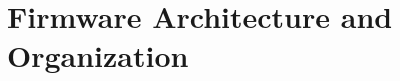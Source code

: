 \clearpage
\section{Firmware Architecture and Organization}
\label{sec:firmware_architecture}








